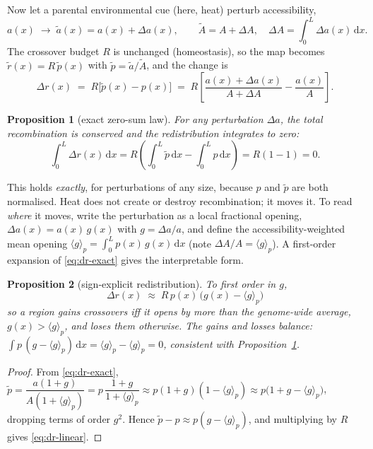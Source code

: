 \documentclass[11pt]{article}
\newtheorem{proposition}{Proposition}
\theoremstyle{remark}
\newcommand{\dd}{\,\mathrm{d}}
\newcommand{\avg}[1]{\langle #1 \rangle}
\begin{document}
Now let a parental environmental cue (here, heat) perturb accessibility,
\begin{equation}
a(x) \;\longrightarrow\; \tilde a(x) = a(x) + \Delta a(x), \qquad
\tilde A = A + \Delta A, \quad \Delta A = \int_0^L \Delta a(x)\dd x .
\end{equation}
The crossover budget $R$ is unchanged (homeostasis), so the map becomes
$\tilde r(x) = R\,\tilde p(x)$ with $\tilde p = \tilde a / \tilde A$, and the change is
\begin{equation}
\Delta r(x) \;=\; R\big[\tilde p(x) - p(x)\big]
\;=\; R\!\left[\frac{a(x)+\Delta a(x)}{A+\Delta A} - \frac{a(x)}{A}\right].
\label{eq:dr-exact}
\end{equation}

\begin{proposition}[exact zero-sum law]\label{p:zero}
For any perturbation $\Delta a$, the total recombination is conserved and the
redistribution integrates to zero:
\[
\int_0^L \Delta r(x)\dd x
= R\!\left(\int_0^L \tilde p \dd x - \int_0^L p \dd x\right)
= R(1-1) = 0 .
\]
\end{proposition}

\noindent
This holds \emph{exactly}, for perturbations of any size, because $p$ and
$\tilde p$ are both normalised. Heat does not create or destroy recombination; it
moves it. To read \emph{where} it moves, write the perturbation as a local
fractional opening, $\Delta a(x) = a(x)\,g(x)$ with $g = \Delta a / a$, and define
the accessibility-weighted mean opening $\avg{g}_p = \int_0^L p(x)\,g(x)\dd x$
(note $\Delta A / A = \avg{g}_p$). A first-order expansion of \eqref{eq:dr-exact}
gives the interpretable form.

\begin{proposition}[sign-explicit redistribution]\label{p:sign}
To first order in $g$,
\begin{equation}
\boxed{\;\Delta r(x) \;\approx\; R\,p(x)\,\big(g(x) - \avg{g}_p\big)\;}
\label{eq:dr-linear}
\end{equation}
so a region \emph{gains} crossovers iff it opens by more than the genome-wide
average, $g(x) > \avg{g}_p$, and loses them otherwise. The gains and losses
balance: $\int p\,(g-\avg{g}_p)\dd x = \avg{g}_p - \avg{g}_p = 0$, consistent with
Proposition~\ref{p:zero}.
\end{proposition}

\begin{proof}
From \eqref{eq:dr-exact},
$\tilde p = \dfrac{a(1+g)}{A(1+\avg{g}_p)} = p\,\dfrac{1+g}{1+\avg{g}_p}
\approx p(1+g)(1-\avg{g}_p) \approx p\big(1 + g - \avg{g}_p\big)$,
dropping terms of order $g^2$. Hence $\tilde p - p \approx p(g-\avg{g}_p)$, and
multiplying by $R$ gives \eqref{eq:dr-linear}.
\end{proof}
\end{document}
